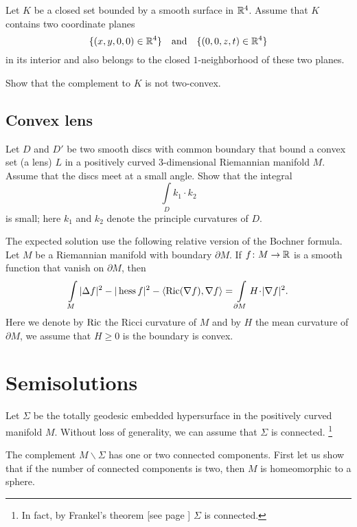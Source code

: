 \begin{pr}
Let $K$ be a closed set bounded by a smooth surface
in $\mathbb{R}^4$.
Assume that $K$ contains two coordinate planes 
$$\{(x,y,0,0)\in\mathbb{R}^4\}
\quad
\text{and}
\quad
\{(0,0,z,t)\in\mathbb{R}^4\}$$
in its interior 
and also belongs to the closed $1$-neighborhood of these two planes.

Show that the complement to $K$ is not two-convex.
\end{pr}


\subsection*{Convex lens\thm}
\label{Convex lens}

\begin{pr} Let $D$ and $D'$ be two smooth discs with common boundary that bound a convex set (a lens) $L$ in a positively curved 3-dimensional Riemannian manifold $M$.
Assume that the discs meet at a small angle.
Show that the integral 
\[\int\limits_{D}k_1\cdot k_2\]
is small; here $k_1$ and $k_2$ denote the principle curvatures of $D$.
\end{pr}

The expected solution use the following relative version of the Bochner formula.
Let $M$ be a Riemannian manifold with boundary $\partial M$.
If $f\colon M\to \mathbb{R}$ is a smooth function that vanish on $\partial M$,
then 
\[\int\limits_M |\Delta f|^2
-|\Hess f|^2
-\langle\mathrm{Ric}(\nabla f),\nabla f\rangle
=\int\limits_{\partial M}
H\cdot|\nabla f|^2.\]
Here we denote by $\operatorname{\rm Ric}$ the Ricci curvature of $M$ 
and by $H$ the mean curvature of $\partial M$, we assume that $H\ge 0$ is the boundary is convex.



\section*{Semisolutions}



Let $\Sigma$ be the totally geodesic embedded hypersurface in the positively curved manifold $M$.
Without loss of generality, we can assume that $\Sigma$ is connected.%
\footnote{In fact, by Frankel's theorem [see page \pageref{page:frankel}] $\Sigma$ is connected.}

The complement $M\backslash\Sigma$ has one or two connected components.
First let us show that if the number of connected components is two, 
then $M$ is homeomorphic to a sphere.

